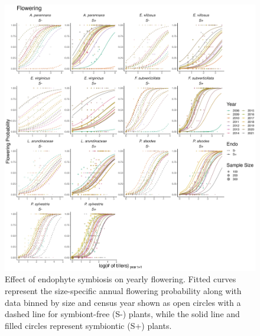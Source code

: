 \documentclass[9pt,twoside,lineno]{pnas-new}
\begin{document}
\begin{figure}
	\centering
	\includegraphics[width=\linewidth]{flw_yearplot.png}
	\caption{Effect of endophyte symbiosis on yearly flowering. Fitted curves represent the size-specific annual flowering probability along with data binned by size and census year shown as open circles with a dashed line for symbiont-free (S-) plants, while the solid line and filled circles represent symbiontic (S+) plants.}
\end{figure}
\end{document}

